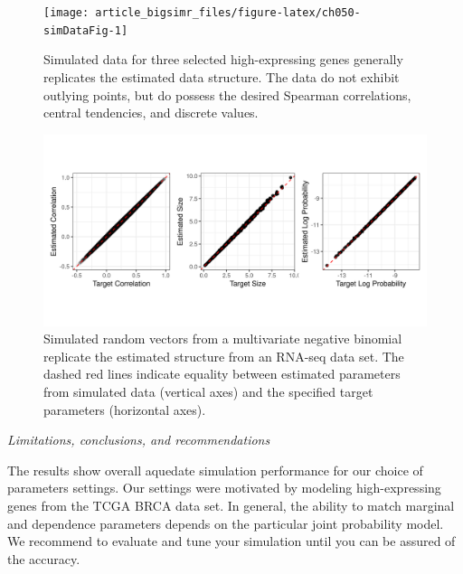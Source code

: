 \documentclass[
]{jss}
\begin{document}
\begin{CodeChunk}
\begin{figure}

{\centering \texttt{[image: article\_bigsimr\_files/figure-latex/ch050-simDataFig-1]} 

}

\caption[Simulated data for three selected high-expressing genes generally replicates the estimated data structure]{Simulated data for three selected high-expressing genes generally replicates the estimated data structure. The data do not exhibit outlying points, but do possess the desired Spearman correlations, central tendencies, and discrete values.}\label{fig:ch050-simDataFig}
\end{figure}
\end{CodeChunk}

\begin{CodeChunk}
\begin{figure}

{\centering \includegraphics[width=0.8\linewidth]{fig/ch050-figBRCA} 

}

\caption[Simulated random vectors from a multivariate negative binomial replicate the estimated structure from an RNA-seq data set]{Simulated random vectors from a multivariate negative binomial replicate the estimated structure from an RNA-seq data set. The dashed red lines indicate equality between estimated parameters from simulated data (vertical axes) and the specified target parameters (horizontal axes).}\label{fig:ch050-figBRCA}
\end{figure}
\end{CodeChunk}

\emph{Limitations, conclusions, and recommendations}

The results show overall aquedate simulation performance for our choice
of parameters settings. Our settings were motivated by modeling
high-expressing genes from the TCGA BRCA data set. In general, the
ability to match marginal and dependence parameters depends on the
particular joint probability model. We recommend to evaluate and tune
your simulation until you can be assured of the accuracy.
\end{document}
